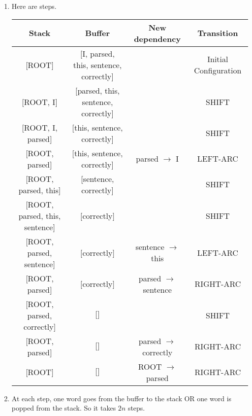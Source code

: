 \documentclass{article}
\begin{document}
\begin{enumerate}[label=(\alph*)]
\item Here are steps.
\begin{center}
\footnotesize
\begin{tabular}{c|c|c|c}
Stack & Buffer & New dependency & Transition \\
\hline
$\lbrack$ROOT$\rbrack$ & $\lbrack$I, parsed, this, sentence, correctly$\rbrack$ & & Initial Configuration \\
$\lbrack$ROOT, I$\rbrack$ & $\lbrack$parsed, this, sentence, correctly$\rbrack$ & & SHIFT \\
$\lbrack$ROOT, I, parsed$\rbrack$ & $\lbrack$this, sentence, correctly$\rbrack$ & & SHIFT \\
$\lbrack$ROOT, parsed$\rbrack$ & $\lbrack$this, sentence, correctly$\rbrack$ & parsed $\rightarrow$ I & LEFT-ARC \\
$\lbrack$ROOT, parsed, this$\rbrack$ & $\lbrack$sentence, correctly$\rbrack$ & & SHIFT \\
$\lbrack$ROOT, parsed, this, sentence$\rbrack$ & $\lbrack$correctly$\rbrack$ & & SHIFT \\
$\lbrack$ROOT, parsed, sentence$\rbrack$ & $\lbrack$correctly$\rbrack$ & sentence $\rightarrow$ this & LEFT-ARC \\
$\lbrack$ROOT, parsed$\rbrack$ & $\lbrack$correctly$\rbrack$ & parsed $\rightarrow$ sentence & RIGHT-ARC \\
$\lbrack$ROOT, parsed, correctly$\rbrack$ & $\lbrack$$\rbrack$ & & SHIFT \\
$\lbrack$ROOT, parsed$\rbrack$ & $\lbrack$$\rbrack$ & parsed $\rightarrow$ correctly & RIGHT-ARC \\
$\lbrack$ROOT$\rbrack$ & $\lbrack$$\rbrack$ & ROOT $\rightarrow$ parsed & RIGHT-ARC \\
\end{tabular}
\end{center}
\item At each step, one word goes from the buffer to the stack OR one word is popped from the stack. So it takes $2n$ steps.
\end{enumerate}
\end{document}
